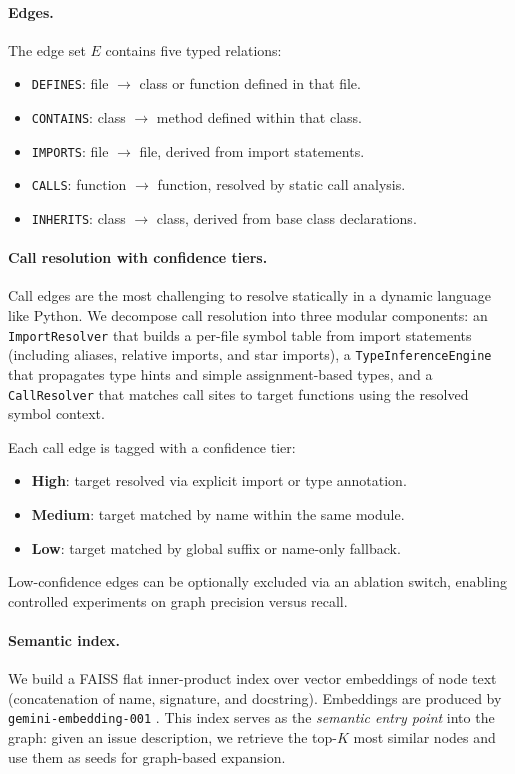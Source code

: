 \paragraph{Edges.}
The edge set $E$ contains five typed relations:
\begin{itemize}[leftmargin=1.5em]
  \item \texttt{DEFINES}: file $\to$ class or function defined in that file.
  \item \texttt{CONTAINS}: class $\to$ method defined within that class.
  \item \texttt{IMPORTS}: file $\to$ file, derived from import statements.
  \item \texttt{CALLS}: function $\to$ function, resolved by static call analysis.
  \item \texttt{INHERITS}: class $\to$ class, derived from base class declarations.
\end{itemize}

\paragraph{Call resolution with confidence tiers.}
Call edges are the most challenging to resolve statically in a dynamic language like Python. We decompose call resolution into three modular components: an \texttt{ImportResolver} that builds a per-file symbol table from import statements (including aliases, relative imports, and star imports), a \texttt{TypeInferenceEngine} that propagates type hints and simple assignment-based types, and a \texttt{CallResolver} that matches call sites to target functions using the resolved symbol context.

Each call edge is tagged with a confidence tier:
\begin{itemize}[leftmargin=1.5em]
  \item \textbf{High}: target resolved via explicit import or type annotation.
  \item \textbf{Medium}: target matched by name within the same module.
  \item \textbf{Low}: target matched by global suffix or name-only fallback.
\end{itemize}
Low-confidence edges can be optionally excluded via an ablation switch, enabling controlled experiments on graph precision versus recall.

\paragraph{Semantic index.}
We build a FAISS \citep{johnson2021faiss} flat inner-product index over vector embeddings of node text (concatenation of name, signature, and docstring). Embeddings are produced by \texttt{gemini-embedding-001} \citep{gemini2024}. This index serves as the \emph{semantic entry point} into the graph: given an issue description, we retrieve the top-$K$ most similar nodes and use them as seeds for graph-based expansion.

